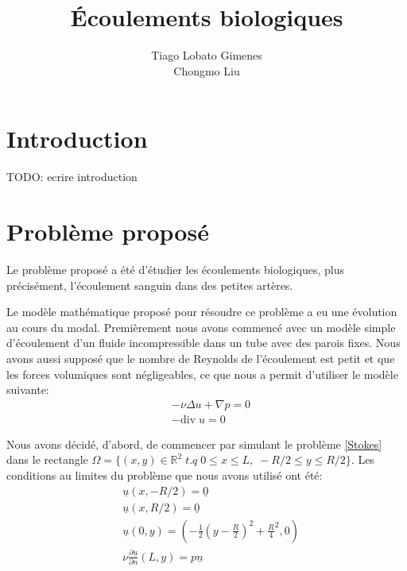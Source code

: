 \documentclass[11pt,a4paper]{article}
\title{Écoulements biologiques}
\author{Tiago Lobato Gimenes \\ Chongmo Liu}
\begin{document}
\maketitle

\section*{Introduction}

TODO: ecrire introduction

\section{Problème proposé}

Le problème proposé a été d'étudier les écoulements biologiques, plus précisément, l'écoulement sanguin dans des petites artères.
 
Le modèle mathématique proposé pour résoudre ce problème a eu une évolution au cours du modal. Premièrement nous avons commencé avec un modèle simple d'écoulement d'un fluide incompressible dans un tube avec des parois fixes. Nous avons aussi supposé que le nombre de Reynolds de  l'écoulement est petit et que les forces volumiques sont négligeables, ce que nous a permit d'utiliser le modèle suivante:
\begin{equation}
\begin{aligned}
& -\nu \Delta u + \nabla p = 0 \\
& -\mathrm{div}\;u = 0 \label{Stokes}
\end{aligned}
\end{equation}

Nous avons décidé, d'abord, de commencer par simulant le problème \ref{Stokes} dans le rectangle $\Omega = \{(x,y) \in \mathbb{R}^2 \;t.q\; 0 \leq x \leq L, \; -R/2 \leq y \leq R/2\}$. Les conditions au limites du problème que nous avons utilisé ont été:
\begin{equation}
\begin{aligned}
& \underline{u}(x,-R/2) = \underline{0} \\
& \underline{u}(x, R/2) = \underline{0} \\
& \underline{u}(0,y) = \left(-\frac{1}{2}\left(y-\frac{R}{2}\right)^2 + \frac{R}{4}^2, 0\right) \\
& \nu\frac{\partial\underline{u}}{\partial n}(L,y) = p\underline{n}
\end{aligned} \label{LimitesClassiques}
\end{equation}
\end{document}
